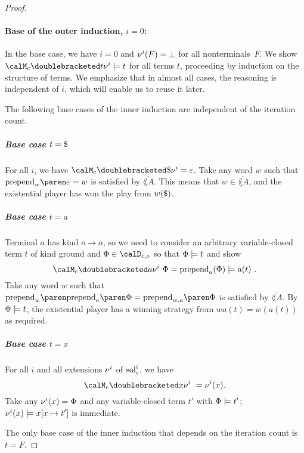 \documentclass[../../diss.tex]{subfiles}
\begin{document}
\begin{proof}
    \paragraph{Base of the outer induction, $i=0$:}

        In the base case, we have $i=0$ and $\nu^i(F)=\bot$ for all nonterminals~$F$.
        We show $\semc{t}{\val^i} \gamesound t$ for all terms $t$, proceeding by induction on the structure of terms.
        We emphasize that in almost all cases, the reasoning is independent of $i$, which will enable us to reuse it later.

        The following base cases of the inner induction are independent of the iteration count.

        \subparagraph{Base case $t = \wordend$}
            For all $i$, we have
            $\semc{\wordend}{\val^i} = \eps$.
            Take any word $w$ such that
            $\prepend{w}{\eps} = w$
            is satisfied by $\overline{\lang{A}}$.
            This means that $w \in \overline{\lang{A}}$, and the existential player has won the play from $w(\$)$.

        \subparagraph{Base case $t = a$}
            Terminal $a$ has kind $o \to o$, so we need to consider an arbitrary variable-closed term $t$ of kind ground and $\judgment \in \domainc{\ground}$ so that $\Phi \models t$ and show
            \[
                \semc{a}{\val^i} \appl \judgment =
                \prepend{a}(\judgment) \gamesound a(t)
                \ .
            \]
            Take any word $w$ such that
            $\prepend{w}{\prepend{a}{\judgment}} = \prepend{w.a}{\judgment}$
            is satisfied by $\overline{\lang{A}}$.
            By
            $\Phi \models t$,
            the existential player has a winning strategy from $wa(t) = w(a(t))$ as required.

        \subparagraph{Base case $t = x$}
            For all $i$ and all extensions $\nu^i$ of $\solc^i$, we have
            \[
                \semc{x}{\val^i}
                \ =
                \val^i(x).
            \]
            Take any $\nu^i(x)=\Phi$ and any variable-closed term $t'$ with $\Phi \models t'$; $\nu^i(x) \models x[x \mapsto t']$ is immediate.

        The only base case of the inner induction that depends on the iteration count is $t=F$.


\end{proof}
\end{document}
